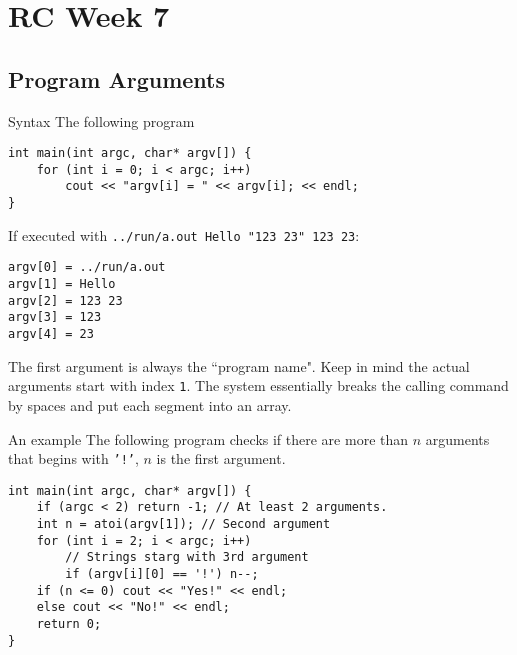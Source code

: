 \section{RC Week 7}
\subsection{Program Arguments}
\begin{frame}[fragile]{Syntax}	
The following program 
\begin{verbatim}
int main(int argc, char* argv[]) {
    for (int i = 0; i < argc; i++)
        cout << "argv[i] = " << argv[i]; << endl;
}
\end{verbatim}
If executed with \texttt{../run/a.out Hello "123 23" 123 23}:
\begin{verbatim}
argv[0] = ../run/a.out
argv[1] = Hello
argv[2] = 123 23
argv[3] = 123
argv[4] = 23
\end{verbatim}
The first argument is always the ``program name". Keep in mind the actual arguments start with index \texttt{1}. The system essentially breaks the calling command by spaces and put each segment into an array.
\end{frame}

\begin{frame}[fragile]{An example}
The following program checks if there are more than $n$ arguments that begins with \texttt{'!'}, $n$ is the first argument.
\begin{verbatim}
int main(int argc, char* argv[]) {
    if (argc < 2) return -1; // At least 2 arguments.
    int n = atoi(argv[1]); // Second argument
    for (int i = 2; i < argc; i++)
        // Strings starg with 3rd argument
        if (argv[i][0] == '!') n--;
    if (n <= 0) cout << "Yes!" << endl;
    else cout << "No!" << endl;
    return 0;
}
\end{verbatim}
\end{frame}
